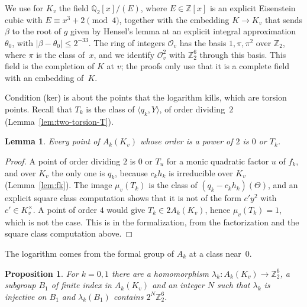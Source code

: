 \documentclass[11pt]{amsart}
\newtheorem{lemma}[theorem]{Lemma}
\newtheorem{proposition}[theorem]{Proposition}
\theoremstyle{definition}
\numberwithin{equation}{section}
\newcommand{\Z}{\mathbb{Z}}
\newcommand{\Qt}{\mathbb{Q}_2}
\newcommand{\Zt}{\mathbb{Z}_2}
\newcommand{\Ov}{\mathcal{O}_v}
\newcommand{\kv}{K_v}
\newcommand{\lean}[1]{\ignorespaces}
\begin{document}
We use for $\kv$ the field $\Qt[x]/(E)$, where $E\in\Z[x]$ is an explicit Eisenstein cubic with $E\equiv x^3+2\pmod4$, together with the embedding $K\to\kv$ that sends $\beta$ to the root of $g$ given by Hensel's lemma at an explicit integral approximation $\theta_0$, with $|\beta-\theta_0|\le2^{-33}$. The ring of integers $\Ov$ has the basis $1,\pi,\pi^2$ over $\Zt$, where $\pi$ is the class of~$x$, and we identify $\Ov^2$ with $\Zt^6$ through this basis. This field is the completion of $K$ at $v$; the proofs only use that it is a complete field with an embedding of~$K$.

Condition (ker) is about the points that the logarithm kills, which are torsion points. Recall that $T_k$ is the class of $\langle q_k,Y\rangle$, of order dividing~$2$ (Lemma~\ref{lem:two-torsion-T}).

\begin{lemma}\label{lem:local-2-torsion}\lean{FurioLombardo.Discharge.M3a.localTwoTorsion_of_L1Inputs, FurioLombardo.Discharge.M3a.Bruin.l1Inputs, FurioLombardo.Discharge.M3a.Bruin.localFacts_Kv, FurioLombardo.Discharge.M4Log.two_torsion_Kv}
Every point of $A_k(\kv)$ whose order is a power of $2$ is $0$ or $T_k$.
\end{lemma}

\begin{proof}
A point of order dividing $2$ is $0$ or $T_u$ for a monic quadratic factor $u$ of $f_k$, and over $\kv$ the only one is $q_k$, because $c_kh_k$ is irreducible over $\kv$ (Lemma~\ref{lem:fk}). The image $\mu_v(T_k)$ is the class of $(q_k-c_kh_k)(\Theta)$, and an explicit square class computation shows that it is not of the form $c'y^2$ with $c'\in\kv^\times$. A point of order $4$ would give $T_k\in2A_k(\kv)$, hence $\mu_v(T_k)=1$, which is not the case. This is  in the formalization, from the factorization and the square class computation above.
\end{proof}

The logarithm comes from the formal group of $A_k$ at a class near~$0$.

\begin{proposition}\label{prop:log}\lean{FurioLombardo.Discharge.R7.ChartLog.logChartFin, FurioLombardo.Discharge.M4Log.lam, FurioLombardo.Discharge.M4Box.DCertData.chartLog}
For $k=0,1$ there are a homomorphism $\lambda_k:A_k(\kv)\to\Zt^6$, a subgroup $B_1$ of finite index in $A_k(\kv)$ and an integer $N$ such that $\lambda_k$ is injective on $B_1$ and $\lambda_k(B_1)$ contains $2^N\Zt^6$.
\end{proposition}
\end{document}
